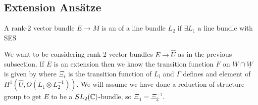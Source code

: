 \documentclass{article}
\begin{document}
\subsection{Extension Ans\"atze}

\begin{definition}
	A rank-2 vector bundle $E \to M$ is an  of a line bundle $L_2$ if $\exists L_1$ a line bundle with SES
\end{definition}

We want to be considering rank-2 vector bundles $E \to \hat{U}$ as in the previous subsection. If $E$ is an extension then we know the transition function $F$ on $W \cap \underline{W}$ is given by 
where $\Xi_i$ is the transition function of $L_i$ and $\Gamma$ defines and element of $H^1(\hat{U}, O(L_1 \otimes L_2^{-1}))$. We will assume we have done a reduction of structure group to get $E$ to be a $SL_2(\mathbb{C})$-bundle, so $\Xi_1 = \Xi_2^{-1}$.
\end{document}
